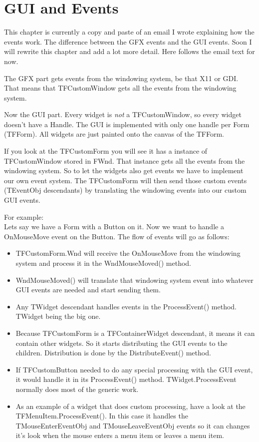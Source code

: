 \documentclass[a4paper,11pt]{report}
\begin{document}
\chapter{GUI and Events}
This chapter is currently a copy and paste of an email I wrote explaining
how the events work. The difference between the GFX events and the GUI events. 
Soon I will rewrite this chapter and add a lot more detail. Here follows the email
text for now.

The GFX part gets events from the windowing system, be that X11 or 
GDI. That means that TFCustomWindow gets all the events from the 
windowing system.

Now the GUI part. Every widget is \emph{not} a TFCustomWindow, so every 
widget doesn't have a Handle.  The GUI is implemented with only one 
handle per Form (TFForm).  All widgets are just painted onto the canvas 
of the TFForm.

If you look at the TFCustomForm you will see it has a instance of 
TFCustomWindow stored in FWnd. That instance gets all the events from 
the windowing system. So to let the widgets also get events we have to 
implement our own event system. The TFCustomForm will then send those 
custom events (TEventObj descendants) by translating the windowing 
events into our custom GUI events.

For example:\\
Lets say we have a Form with a Button on it. Now we want to handle a 
OnMouseMove event on the Button.  The flow of events will go as follows:

\begin{itemize}
	\item TFCustomForm.Wnd  will receive the OnMouseMove from the windowing 
system and process it in the WndMouseMoved() method.

	\item WndMouseMoved() will translate that windowing system event into 
whatever GUI events are needed and start sending them.

	\item Any TWidget descendant handles events in the ProcessEvent() method. 
TWidget being the big one.

	\item Because TFCustomForm is a TFContainerWidget descendant, it means it 
can contain other widgets. So it starts distributing the GUI events to 
the children. Distribution is done by the DistributeEvent() method.

	\item If TFCustomButton needed to do any special processing with the GUI 
event, it would handle it in its ProcessEvent() method. 
TWidget.ProcessEvent normally does most of the generic work.

	\item As an example of a widget that does custom processing, have a 
look at the TFMenuItem.ProcessEvent(). In this case it handles the 
TMouseEnterEventObj and TMouseLeaveEventObj events so it can changes 
it's look when the mouse enters a menu item or leaves a menu item.
\end{itemize}
\end{document}
